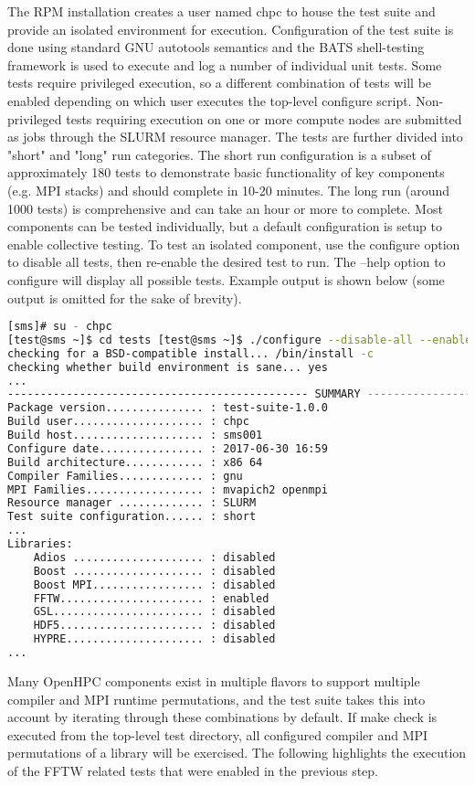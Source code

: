 The RPM installation creates a user named chpc to house the test suite and provide an isolated environment for execution. Configuration of the test suite is done using standard GNU autotools semantics and the BATS shell-testing framework is used to execute and log a number of individual unit tests. Some tests require privileged execution, so a different combination of tests will be enabled depending on which user executes the top-level configure script. Non-privileged tests requiring execution on one or more compute nodes are submitted as jobs through the SLURM resource manager. The tests are further divided into "short" and "long" run categories. The short run configuration is a subset of approximately 180 tests to demonstrate basic functionality of key components (e.g. MPI stacks) and should complete in 10-20 minutes. The long run (around 1000 tests) is comprehensive and can take an hour or more to complete. Most components can be tested individually, but a default configuration is setup to enable collective testing. To test an isolated component, use the configure option to disable all tests, then re-enable the desired test to run. The --help option to configure will display all possible tests. Example output is shown below (some output is omitted for the sake of brevity).
\begin{lstlisting}[language=bash,keywords={},upquote=true]
[sms]# su - chpc
[test@sms ~]$ cd tests [test@sms ~]$ ./configure --disable-all --enable-fftw 
checking for a BSD-compatible install... /bin/install -c 
checking whether build environment is sane... yes 
... 
---------------------------------------------- SUMMARY --------------------------------------------
Package version............... : test-suite-1.0.0
Build user.................... : chpc
Build host.................... : sms001 
Configure date................ : 2017-06-30 16:59
Build architecture............ : x86 64 
Compiler Families............. : gnu 
MPI Families.................. : mvapich2 openmpi 
Resource manager ............. : SLURM 
Test suite configuration...... : short 
... 
Libraries: 
	Adios .................... : disabled 
	Boost .................... : disabled 
	Boost MPI................. : disabled 
	FFTW...................... : enabled 
	GSL....................... : disabled 
	HDF5...................... : disabled 
	HYPRE..................... : disabled 
...
\end{lstlisting}
	
Many OpenHPC components exist in multiple flavors to support multiple compiler and MPI runtime permutations, and the test suite takes this into account by iterating through these combinations by default.
If make check is executed from the top-level test directory, all configured compiler and MPI permutations of a library will be exercised. The following highlights the execution of the FFTW related tests that were enabled in the previous step.

